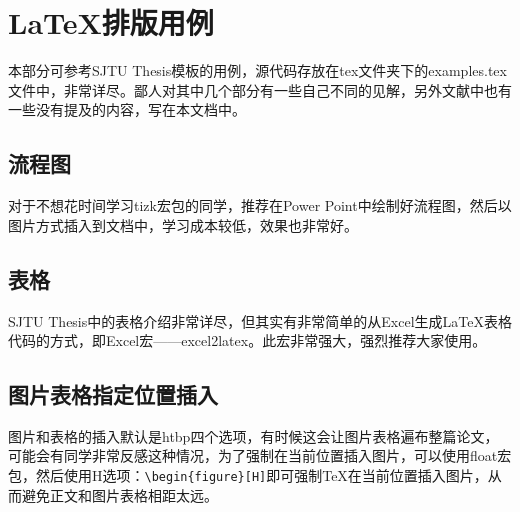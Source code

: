 
\chapter{\LaTeX 排版用例}\label{chap:example}

本部分可参考SJTU Thesis模板\cite{SJTUThesis}的用例，源代码存放在tex文件夹下的examples.tex文件中，非常详尽。鄙人对其中几个部分有一些自己不同的见解，另外文献中也有一些没有提及的内容，写在本文档中。

\section{流程图}

对于不想花时间学习tizk宏包的同学，推荐在Power Point中绘制好流程图，然后以图片方式插入到文档中，学习成本较低，效果也非常好。

\section{表格}

SJTU Thesis中的表格介绍非常详尽，但其实有非常简单的从Excel生成\LaTeX 表格代码的方式，即Excel宏——excel2latex。此宏非常强大，强烈推荐大家使用。

\section{图片表格指定位置插入}

图片和表格的插入默认是htbp四个选项，有时候这会让图片表格遍布整篇论文，可能会有同学非常反感这种情况，为了强制在当前位置插入图片，可以使用float宏包，然后使用H选项：\verb+\begin{figure}[H]+即可强制\TeX 在当前位置插入图片，从而避免正文和图片表格相距太远。
